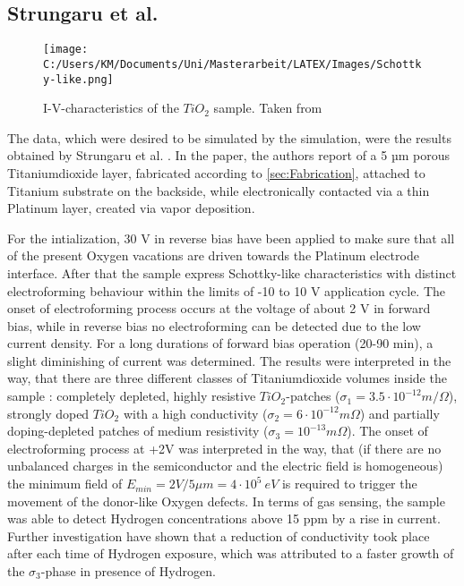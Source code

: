 \documentclass[12pt]{article}
\begin{document}
	\subsection{Strungaru et al.}
	\begin{figure}[bh]
		\centering
			\texttt{[image: C:/Users/KM/Documents/Uni/Masterarbeit/LATEX/Images/Schottky-like.png]}
		\caption{I-V-characteristics of the $TiO_2$ sample. Taken from \cite{Strungaru}}
		\label{fig:Schottky-like}
	\end{figure}
	The data, which were desired to be simulated by the simulation, were the results obtained by Strungaru et al. \cite{Strungaru}.
	In the paper, the authors report of a 5 µm porous Titaniumdioxide layer, fabricated according to \ref{sec:Fabrication}, attached to Titanium substrate on the backside, while electronically contacted via a thin Platinum layer, created via vapor deposition.

  For the intialization, 30 V in reverse bias have been applied to make sure that all of the present Oxygen vacations are driven towards the Platinum electrode interface. After that the sample express Schottky-like characteristics with distinct electroforming behaviour within the limits of -10 to 10 V application cycle. The onset of electroforming process occurs at the voltage of about 2 V in forward bias, while in reverse bias no electroforming can be detected due to the low current density. For a long durations of forward bias operation (20-90 min), a slight diminishing of current was determined.
	The results were interpreted in the way, that there are three different classes of Titaniumdioxide volumes inside the sample : completely depleted, highly resistive $TiO_2$-patches ($\sigma_1 = 3.5\cdot 10^{-12} m/\Omega$), strongly doped $TiO_2$ with a high conductivity ($\sigma_2 = 6\cdot 10^{-12}m\Omega$) and partially doping-depleted patches of medium resistivity ($\sigma_3 = 10^{-13} m\Omega$). The onset of electroforming process at +2V was interpreted in the way, that (if there are no unbalanced charges in the semiconductor and the electric field is homogeneous) the minimum field of \(E_{min} = 2V/5 \mu m = 4\cdot 10^5\ eV \) is required to trigger the movement of the donor-like Oxygen defects.
	In terms of gas sensing, the sample was able to detect Hydrogen concentrations above 15 ppm by a rise in current. Further investigation have shown that a reduction of conductivity took place after each time of Hydrogen exposure, which was attributed to a faster growth of the $\sigma_3$-phase in presence of Hydrogen.
	
\end{document}
